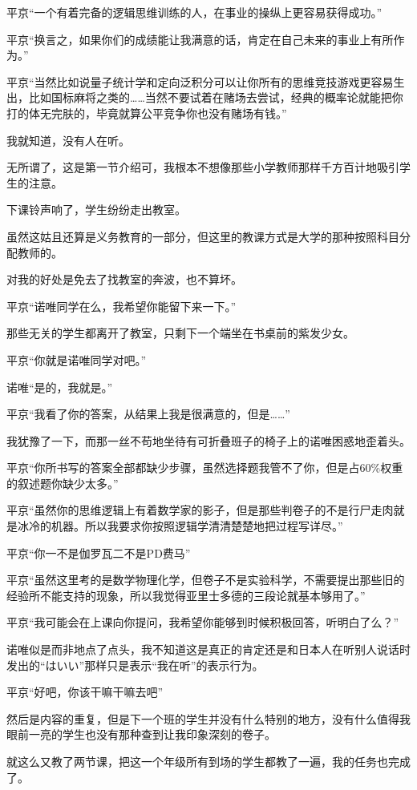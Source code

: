 平京“一个有着完备的逻辑思维训练的人，在事业的操纵上更容易获得成功。”

平京“换言之，如果你们的成绩能让我满意的话，肯定在自己未来的事业上有所作为。”

平京“当然比如说量子统计学和定向泛积分可以让你所有的思维竞技游戏更容易生出，比如国标麻将之类的……当然不要试着在赌场去尝试，经典的概率论就能把你打的体无完肤的，毕竟就算公平竞争你也没有赌场有钱。”

我就知道，没有人在听。

无所谓了，这是第一节介绍可，我根本不想像那些小学教师那样千方百计地吸引学生的注意。

下课铃声响了，学生纷纷走出教室。

虽然这姑且还算是义务教育的一部分，但这里的教课方式是大学的那种按照科目分配教师的。

对我的好处是免去了找教室的奔波，也不算坏。

平京“诺唯同学在么，我希望你能留下来一下。”

那些无关的学生都离开了教室，只剩下一个端坐在书桌前的紫发少女。

平京“你就是诺唯同学对吧。”

诺唯“是的，我就是。”

平京“我看了你的答案，从结果上我是很满意的，但是……”

我犹豫了一下，而那一丝不苟地坐待有可折叠班子的椅子上的诺唯困惑地歪着头。

平京“你所书写的答案全部都缺少步骤，虽然选择题我管不了你，但是占60\%权重的叙述题你缺少太多。”

平京“虽然你的思维逻辑上有着数学家的影子，但是那些判卷子的不是行尸走肉就是冰冷的机器。所以我要求你按照逻辑学清清楚楚地把过程写详尽。”

平京“你一不是伽罗瓦二不是PD费马”

平京“虽然这里考的是数学物理化学，但卷子不是实验科学，不需要提出那些旧的经验所不能支持的现象，所以我觉得亚里士多德的三段论就基本够用了。”

平京“我可能会在上课向你提问，我希望你能够到时候积极回答，听明白了么？”

诺唯似是而非地点了点头，我不知道这是真正的肯定还是和日本人在听别人说话时发出的“はいい”那样只是表示“我在听”的表示行为。

平京“好吧，你该干嘛干嘛去吧”

然后是内容的重复，但是下一个班的学生并没有什么特别的地方，没有什么值得我眼前一亮的学生也没有那种查到让我印象深刻的卷子。

就这么又教了两节课，把这一个年级所有到场的学生都教了一遍，我的任务也完成了。

